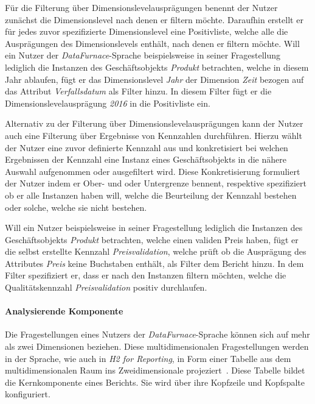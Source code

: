 \documentclass[
  language=german, %
  type=bachelor%
]{isthesis}
\begin{document}
\begin{content}
  Für die Filterung über Dimensionslevelausprägungen benennt der Nutzer
  zunächst die Dimensionslevel nach denen er filtern möchte. Daraufhin erstellt
  er für jedes zuvor spezifizierte Dimensionslevel eine Positivliste, welche
  alle die Ausprägungen des Dimensionslevels enthält, nach denen er filtern
  möchte. Will ein Nutzer der \textit{DataFurnace}-Sprache beispielsweise in
  seiner Fragestellung lediglich die Instanzen des Geschäftsobjekts
  \textit{Produkt} betrachten, welche in diesem Jahr ablaufen, fügt er das
  Dimensionslevel \textit{Jahr} der Dimension \textit{Zeit} bezogen auf das
  Attribut \textit{Verfallsdatum} als Filter hinzu. In diesem Filter fügt er
  die Dimensionslevelausprägung \textit{2016} in die Positivliste ein.

  Alternativ zu der Filterung über Dimensionslevelausprägungen kann der Nutzer
  auch eine Filterung über Ergebnisse von Kennzahlen durchführen. Hierzu wählt
  der Nutzer eine zuvor definierte Kennzahl aus und konkretisiert bei welchen
  Ergebnissen der Kennzahl eine Instanz eines Geschäftsobjekts in die nähere
  Auswahl aufgenommen oder ausgefiltert wird. Diese Konkretisierung formuliert
  der Nutzer indem er Ober- und oder Untergrenze bennent, respektive
  spezifiziert ob er alle Instanzen haben will, welche die Beurteilung der
  Kennzahl bestehen oder solche, welche sie nicht bestehen. 
  
  Will ein Nutzer beispielsweise in seiner Fragestellung lediglich die
  Instanzen des Geschäftsobjekts \textit{Produkt} betrachten, welche einen
  validen Preis haben, fügt er die selbst erstellte Kennzahl
  \textit{Preisvalidation}, welche prüft ob die Ausprägung des Attributes
  \textit{Preis} keine Buchstaben enthält, als Filter dem Bericht hinzu. In dem
  Filter spezifiziert er, dass er nach den Instanzen filtern möchten, welche
  die Qualitätskennzahl \textit{Preisvalidation} positiv durchlaufen.

  \paragraph{Analysierende Komponente} Die Fragestellungen eines Nutzers der
  \textit{DataFurnace}-Sprache können sich auf mehr als zwei Dimensionen
  beziehen. Diese multidimensionalen Fragestellungen werden in der Sprache, wie
  auch in \textit{H2 for Reporting}, in Form einer Tabelle aus dem
  multidimensionalen Raum ins Zweidimensionale projeziert~\cite[][S.
  23]{becker2007h2}. Diese Tabelle bildet die Kernkomponente eines Berichts.
  Sie wird über ihre Kopfzeile und Kopfspalte konfiguriert.


\end{content}
\end{document}
